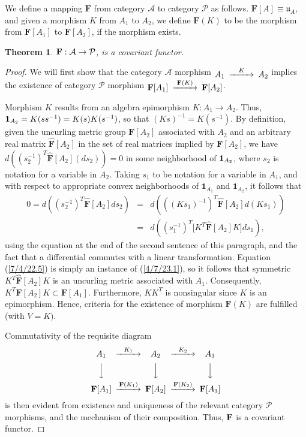 \documentclass{amsart}
\numberwithin{equation}{section}
\newtheorem{theorem}{Theorem}
\theoremstyle{definition}
\numberwithin{theorem}{section}
\begin{document}
We define a mapping $\mathbf{F}$ from category $\mathcal{A}$ to category $\mathcal{P}$ as follows.  $\mathbf{F}[
A] \equiv \mathfrak{u}_A$, and given a morphism $K$ from $A_1$ to $A_2$, we define $\mathbf{F}(K)$ to be the morphism from $\mathbf{F}[A_1]$ to $\mathbf{F}[A_2]$, if the morphism exists.   

\begin{theorem}\label{6/13/22.1}  ${\bf F}: \mathcal{A}\rightarrow \mathcal{P}$, is a covariant functor. 
 \end{theorem}
 \begin{proof}
We will first show that the category $\mathcal{A}$ morphism $ \begin{CD}  A_1 @>K>> A_2\end{CD}$ implies the existence of category $\mathcal{P}$ morphism $ \begin{CD}  {\bf F}[A_1] @>{\bf F}(K)>> {\bf F}[A_2]\end{CD}$.

Morphism $K$ results from an algebra epimorphism $K:A_1\rightarrow A_2$.   Thus, ${\bf 1}_{A_2} = K(ss^{-1}) = K(s)K(s^{-1})$, so that $(Ks)^{-1} = K(s^{-1})$.  By definition, given the uncurling metric group $\mathbf{F}[A_2]$ associated with $A_2$ and an arbitrary real matrix  $\hat{\mathbf{F}}[A_2]$ in the set of real matrices implied by $\mathbf{F}[A_2]$, we have $d\left((s_2^{-1})^T\hat{\mathbf{F}}[A_2] (ds_2)\right) = 0$ in some neighborhood of ${\bf 1}_{A_2}$, where $s_2$ is notation for a variable in $A_2$.  Taking $s_1$ to be notation for a variable in $A_1$, and with respect to appropriate convex neighborhoods of $\mathbf{1}_{A_1}$ and $\mathbf{1}_{A_2}$, it follows that \begin{eqnarray}\nonumber 0 = d\left((s_2^{-1})^T\hat{\mathbf{F}}[A_2] ds_2\right) &=&  d\left(((Ks_1)^{-1})^T\hat{\mathbf{F}}[A_2] d(Ks_1)\right) \\  &=& d\left((s_1^{-1})^T \big[K^T \hat{\mathbf{F}}[A_2]K\big]ds_1\right), \label{7/4/22.5}  \end{eqnarray}   using the equation at the end of the second sentence of this paragraph, and the fact that a differential commutes with a linear transformation.  Equation (\ref{7/4/22.5}) is simply an instance of (\ref{4/7/23.1}), so it follows that symmetric $K^T \hat{\mathbf{F}}[A_2]K$ is an uncurling metric associated with $A_1$.  Consequently, $K^T\mathbf{F}[A_2]K\subset \mathbf{F}[A_1]$.  Furthermore, $KK^T$ is nonsingular since $K$ is an epimorphism.  Hence, criteria for the existence of morphism $\mathbf{F}(K)$ are fulfilled (with $V=K)$.

Commutativity of the requisite diagram
  \[  \begin{CD}  
A_1 @>K_1>> A_2 @>K_2>> A_3\\
 @VVV   @VVV  @VVV\\
 {\bf F}[A_1]   @>{\bf F}(K_1)>>  {\bf F}[A_2]  @>{\bf F}(K_2)>>  {\bf F}[A_3] \\ 
 \end{CD} \]
is then evident from existence and uniqueness of the relevant category $\mathcal{P}$ morphisms, and the mechanism of their composition.  Thus, ${\bf F}$ is a covariant functor. 
\end{proof}
\end{document}

